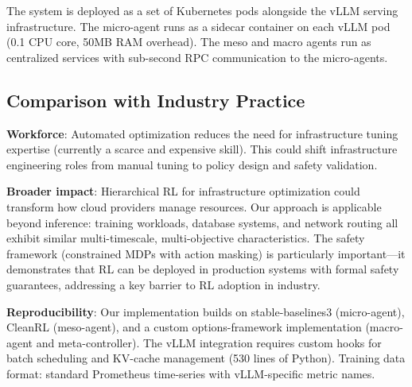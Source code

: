 \documentclass[conference,10pt]{IEEEtran}
\begin{document}
The system is deployed as a set of Kubernetes pods alongside the vLLM serving infrastructure. The micro-agent runs as a sidecar container on each vLLM pod (0.1 CPU core, 50MB RAM overhead). The meso and macro agents run as centralized services with sub-second RPC communication to the micro-agents.

\subsection{Comparison with Industry Practice}

\begin{table}[!htbp]
\caption{Hierarchical RL vs.\ Industry Optimization Approaches}
\label{tab:industry}
\centering\scriptsize
{}
\end{table}


\textbf{Workforce}: Automated optimization reduces the need for infrastructure tuning expertise (currently a scarce and expensive skill). This could shift infrastructure engineering roles from manual tuning to policy design and safety validation.

\textbf{Broader impact}: Hierarchical RL for infrastructure optimization could transform how cloud providers manage resources. Our approach is applicable beyond inference: training workloads, database systems, and network routing all exhibit similar multi-timescale, multi-objective characteristics. The safety framework (constrained MDPs with action masking) is particularly important---it demonstrates that RL can be deployed in production systems with formal safety guarantees, addressing a key barrier to RL adoption in industry.

\textbf{Reproducibility}: Our implementation builds on stable-baselines3 (micro-agent), CleanRL (meso-agent), and a custom options-framework implementation (macro-agent and meta-controller). The vLLM integration requires custom hooks for batch scheduling and KV-cache management (530 lines of Python). Training data format: standard Prometheus time-series with vLLM-specific metric names.
\end{document}
